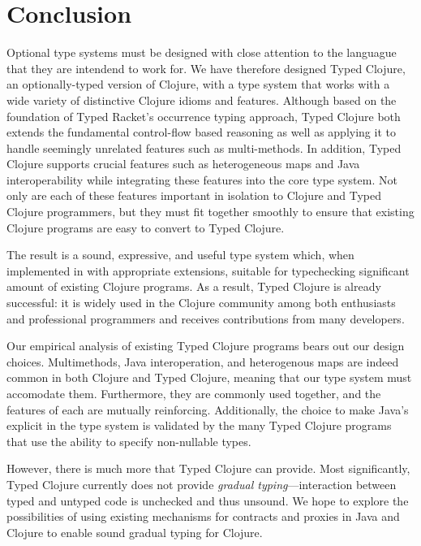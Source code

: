 \section{Conclusion}
\label{sec:conclusion}

Optional type systems must be designed with close attention to the
languague that they are intendend to work for.
We have therefore designed Typed Clojure, an optionally-typed version of
Clojure, with a type system that works with a wide variety of distinctive
Clojure idioms and features. Although based on the foundation of Typed
Racket's occurrence typing approach, Typed Clojure both extends the
fundamental control-flow based reasoning as well as applying it to
handle seemingly unrelated features such as multi-methods. In
addition, Typed Clojure supports crucial features such as
heterogeneous maps and Java interoperability while integrating these
features into the core type system. Not only are each of these
features important in isolation to Clojure and Typed Clojure
programmers, but they must fit together smoothly to ensure that
existing Clojure programs are easy to convert to Typed Clojure.

The result is a sound, expressive, and useful type system which, when
implemented in \coretyped with appropriate extensions, suitable for
typechecking significant amount of existing Clojure programs.
%
As a result, Typed Clojure is already successful: it is widely used in
the Clojure community among both enthusiasts and professional
programmers and receives contributions from many developers.

Our empirical analysis of existing Typed Clojure programs bears out
our design choices. Multimethods, Java interoperation, and
heterogenous maps are indeed common in both Clojure and Typed Clojure,
meaning that our type system must accomodate them. Furthermore, they
are commonly used together, and the features of each are mutually
reinforcing. Additionally, the choice to make Java's 
explicit in the type system is validated by the many Typed Clojure
programs that use the ability to specify non-nullable types.



However, there is much more that Typed Clojure can provide. Most
significantly, Typed Clojure currently does not provide \emph{gradual
  typing}---interaction between typed and untyped code is unchecked and
thus unsound. We hope to explore the possibilities of using existing
mechanisms for contracts and proxies in Java and
Clojure to enable sound gradual typing for Clojure.


